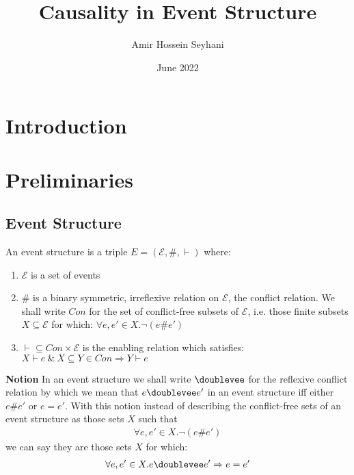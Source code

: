 \documentclass{article}
\title{Causality in Event Structure}
\author{Amir Hossein Seyhani}
\date{June 2022}
\begin{document}
\maketitle

\tableofcontents
\pagebreak

\section{Introduction}

\section{Preliminaries}

\subsection{Event Structure}
\begin{definition}
An event structure is a triple $E = (\mathcal{E},\#,\vdash)$ where:
\begin{enumerate}
    \item $\mathcal{E}$ is a set of events
    \item \# is a binary symmetric, irreflexive relation on $\mathcal{E}$,
    the conflict relation.
    We shall write $Con$ for the set of conflict-free subsets of $\mathcal{E}$,
    i.e. those finite subsets $X \subseteq \mathcal{E}$ for which:
    $\forall e,e' \in X . \neg (e\#e')$
    \item $\vdash \subseteq Con \times \mathcal{E}$ is the enabling relation which satisfies:
    $ X \vdash e \ \& \ X \subseteq Y \in Con \Rightarrow Y \vdash e$
\end{enumerate}

\end{definition}
\textbf{Notion}
In an event structure we shall write $\doublevee$ for the reflexive conflict relation by which we mean
that $e\doublevee e'$ in an event structure iff either $e\#e'$ or $e=e'$.
With this notion instead of describing the conflict-free sets of an event structure
as those sets $X$ such that
\begin{align*}
    \forall e,e' \in X. \neg(e\#e')
\end{align*}
we can say they are those sets $X$ for which:
\begin{align*}
    \forall e,e' \in X. e\doublevee e' \Rightarrow e=e'
\end{align*}
\end{document}
